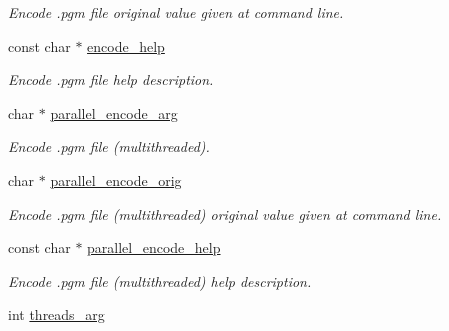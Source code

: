 \begin{DoxyCompactItemize}
\begin{DoxyCompactList}\small\item\em Encode .pgm file original value given at command line. \end{DoxyCompactList}\item 
\hypertarget{structgengetopt__args__info_a3301620721f8488d3af225fba250557c}{}const char $\ast$ \hyperlink{structgengetopt__args__info_a3301620721f8488d3af225fba250557c}{encode\+\_\+help}\label{structgengetopt__args__info_a3301620721f8488d3af225fba250557c}

\begin{DoxyCompactList}\small\item\em Encode .pgm file help description. \end{DoxyCompactList}\item 
\hypertarget{structgengetopt__args__info_ad1e7d9b2114ee14797a93cbcba36ef80}{}char $\ast$ \hyperlink{structgengetopt__args__info_ad1e7d9b2114ee14797a93cbcba36ef80}{parallel\+\_\+encode\+\_\+arg}\label{structgengetopt__args__info_ad1e7d9b2114ee14797a93cbcba36ef80}

\begin{DoxyCompactList}\small\item\em Encode .pgm file (multithreaded). \end{DoxyCompactList}\item 
\hypertarget{structgengetopt__args__info_a55fb1d4cb6bc1a6913e22c4f887bf52e}{}char $\ast$ \hyperlink{structgengetopt__args__info_a55fb1d4cb6bc1a6913e22c4f887bf52e}{parallel\+\_\+encode\+\_\+orig}\label{structgengetopt__args__info_a55fb1d4cb6bc1a6913e22c4f887bf52e}

\begin{DoxyCompactList}\small\item\em Encode .pgm file (multithreaded) original value given at command line. \end{DoxyCompactList}\item 
\hypertarget{structgengetopt__args__info_a7149e8a47e37e4688853c067e0aebc3e}{}const char $\ast$ \hyperlink{structgengetopt__args__info_a7149e8a47e37e4688853c067e0aebc3e}{parallel\+\_\+encode\+\_\+help}\label{structgengetopt__args__info_a7149e8a47e37e4688853c067e0aebc3e}

\begin{DoxyCompactList}\small\item\em Encode .pgm file (multithreaded) help description. \end{DoxyCompactList}\item 
\hypertarget{structgengetopt__args__info_a691cdcfa9efb6faa4f508d2884baccd4}{}int \hyperlink{structgengetopt__args__info_a691cdcfa9efb6faa4f508d2884baccd4}{threads\+\_\+arg}\label{structgengetopt__args__info_a691cdcfa9efb6faa4f508d2884baccd4}


\end{DoxyCompactItemize}
